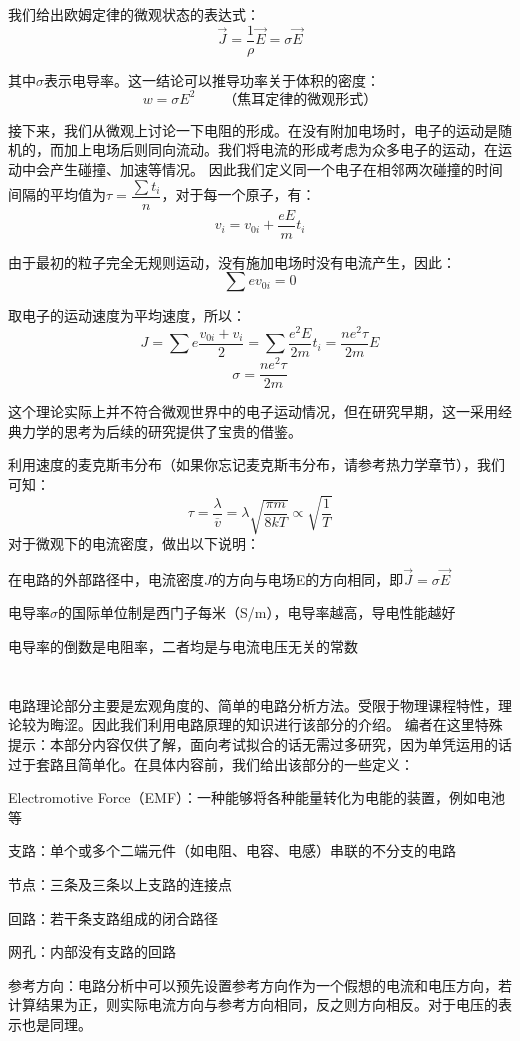 \begin{law}
    我们给出欧姆定律的微观状态的表达式：
    \[\vec{J}=\dfrac{1}{\rho}\vec{E}=\sigma \vec{E}\]
    
    其中$\sigma$表示电导率。这一结论可以推导功率关于体积的密度：
    \[w=\sigma E^2\qquad\text{（焦耳定律的微观形式）}\]
\end{law}

接下来，我们从微观上讨论一下电阻的形成。在没有附加电场时，电子的运动是随机的，而加上电场后则同向流动。我们将电流的形成考虑为众多电子的运动，在运动中会产生碰撞、加速等情况。
因此我们定义同一个电子在相邻两次碰撞的时间间隔的平均值为$\tau=\dfrac{\sum t_i}{n}$，对于每一个原子，有：
\[v_i = v_{0i}+\dfrac{eE}{m}t_i\]

由于最初的粒子完全无规则运动，没有施加电场时没有电流产生，因此：
\[\sum ev_{0i} = 0\]

取电子的运动速度为平均速度，所以：
\[J = \sum e\dfrac{v_{0i}+v_i}{2} = \sum \dfrac{e^2 E}{2m}t_i=\dfrac{ne^2\tau}{2m}E\]
\[\sigma=\dfrac{ne^2\tau}{2m}\]

这个理论实际上并不符合微观世界中的电子运动情况，但在研究早期，这一采用经典力学的思考为后续的研究提供了宝贵的借鉴。

利用速度的麦克斯韦分布（如果你忘记麦克斯韦分布，请参考热力学章节），我们可知：
\[\tau=\dfrac{\lambda}{\overline{v}}=\lambda\sqrt{\dfrac{\pi m}{8kT}}\propto\sqrt{\dfrac{1}{T}}\]
对于微观下的电流密度，做出以下说明：
\begin{Itemize}
    \item 在电路的外部路径中，电流密度$J$的方向与电场E的方向相同，即$\vec{J}=\sigma\vec{E}$
    \item 电导率$\sigma$的国际单位制是西门子每米（S/m），电导率越高，导电性能越好
    \item 电导率的倒数是电阻率，二者均是与电流电压无关的常数
\end{Itemize}
\section[电路理论]{}
电路理论部分主要是宏观角度的、简单的电路分析方法。受限于物理课程特性，理论较为晦涩。因此我们利用电路原理的知识进行该部分的介绍。
编者在这里特殊提示：本部分内容仅供了解，面向考试拟合的话无需过多研究，因为单凭运用的话过于套路且简单化。在具体内容前，我们给出该部分的一些定义：
\begin{Itemize}
    \item Electromotive Force（EMF）：一种能够将各种能量转化为电能的装置，例如电池等
    \item 支路：单个或多个二端元件（如电阻、电容、电感）串联的不分支的电路
    \item 节点：三条及三条以上支路的连接点
    \item 回路：若干条支路组成的闭合路径
    \item 网孔：内部没有支路的回路
    \item 参考方向：电路分析中可以预先设置参考方向作为一个假想的电流和电压方向，若计算结果为正，则实际电流方向与参考方向相同，反之则方向相反。对于电压的表示也是同理。
\end{Itemize}
